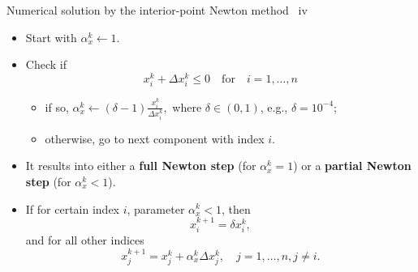 \begin{frame}{Numerical solution by the interior-point Newton method \, iv}

\begin{itemize}
\item Start with $\alpha_{x}^{k}\gets1$.
\item Check if 
\[
x_{i}^{k}+\Delta x_{i}^{k}\leq0 \quad \text{for} \quad i=1,\ldots, n
\]
%
\begin{itemize}
\item if so, ${\displaystyle \alpha_{x}^{k}\gets(\delta-1)\frac{x_{i}^{k}}{\Delta x_{i}^{k}},}$
where $\delta\in(0,1)$, e.g., $\delta=10^{-4}$;
\item otherwise, go to next component with index $i$.
\end{itemize}
\item It results into either 
a \alert{\bf full Newton step} (for $\alpha_{x}^{k}=1$) or
a \alert{\bf partial Newton step}  (for $\alpha_{x}^{k}<1$).

\item If for certain index $i$, parameter $\alpha_{x}^{k}<1$, then
%
\[
x_{i}^{k+1}=\delta x_{i}^{k},
\]
and for all other indices
% 
\[
x_{j}^{k+1}=x_{j}^{k}+\alpha_{x}^{k}\Delta x_{j}^{k}, \quad j=1,\ldots, n, j\neq i.
\]
\end{itemize}

\end{frame}
%
%
